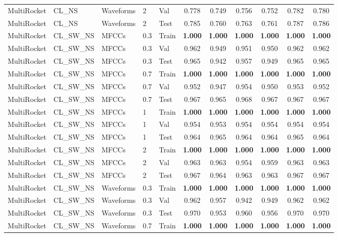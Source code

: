 \begin{landscape}
\begin{longtable}{|l|l|l|l|l|c|c|c|c|c|c|}
MultiRocket & CL\_NS & Waveforms & 2 & Val & 0.778 & 0.749 & 0.756 & 0.752 & 0.782 & 0.780 \\
MultiRocket & CL\_NS & Waveforms & 2 & Test & 0.785 & 0.760 & 0.763 & 0.761 & 0.787 & 0.786 \\
MultiRocket & CL\_SW\_NS & MFCCs & 0.3 & Train & \textbf{1.000} & \textbf{1.000} & \textbf{1.000} & \textbf{1.000} & \textbf{1.000} & \textbf{1.000} \\
MultiRocket & CL\_SW\_NS & MFCCs & 0.3 & Val & 0.962 & 0.949 & 0.951 & 0.950 & 0.962 & 0.962 \\
MultiRocket & CL\_SW\_NS & MFCCs & 0.3 & Test & 0.965 & 0.942 & 0.957 & 0.949 & 0.965 & 0.965 \\
MultiRocket & CL\_SW\_NS & MFCCs & 0.7 & Train & \textbf{1.000} & \textbf{1.000} & \textbf{1.000} & \textbf{1.000} & \textbf{1.000} & \textbf{1.000} \\
MultiRocket & CL\_SW\_NS & MFCCs & 0.7 & Val & 0.952 & 0.947 & 0.954 & 0.950 & 0.953 & 0.952 \\
MultiRocket & CL\_SW\_NS & MFCCs & 0.7 & Test & 0.967 & 0.965 & 0.968 & 0.967 & 0.967 & 0.967 \\
MultiRocket & CL\_SW\_NS & MFCCs & 1 & Train & \textbf{1.000} & \textbf{1.000} & \textbf{1.000} & \textbf{1.000} & \textbf{1.000} & \textbf{1.000} \\
MultiRocket & CL\_SW\_NS & MFCCs & 1 & Val & 0.954 & 0.953 & 0.954 & 0.954 & 0.954 & 0.954 \\
MultiRocket & CL\_SW\_NS & MFCCs & 1 & Test & 0.964 & 0.965 & 0.964 & 0.964 & 0.965 & 0.964 \\
MultiRocket & CL\_SW\_NS & MFCCs & 2 & Train & \textbf{1.000} & \textbf{1.000} & \textbf{1.000} & \textbf{1.000} & \textbf{1.000} & \textbf{1.000} \\
MultiRocket & CL\_SW\_NS & MFCCs & 2 & Val & 0.963 & 0.963 & 0.954 & 0.959 & 0.963 & 0.963 \\
MultiRocket & CL\_SW\_NS & MFCCs & 2 & Test & 0.967 & 0.964 & 0.963 & 0.963 & 0.967 & 0.967 \\
MultiRocket & CL\_SW\_NS & Waveforms & 0.3 & Train & \textbf{1.000} & \textbf{1.000} & \textbf{1.000} & \textbf{1.000} & \textbf{1.000} & \textbf{1.000} \\
MultiRocket & CL\_SW\_NS & Waveforms & 0.3 & Val & 0.962 & 0.957 & 0.942 & 0.949 & 0.962 & 0.962 \\
MultiRocket & CL\_SW\_NS & Waveforms & 0.3 & Test & 0.970 & 0.953 & 0.960 & 0.956 & 0.970 & 0.970 \\
MultiRocket & CL\_SW\_NS & Waveforms & 0.7 & Train & \textbf{1.000} & \textbf{1.000} & \textbf{1.000} & \textbf{1.000} & \textbf{1.000} & \textbf{1.000} \\

\end{longtable}
\end{landscape}
